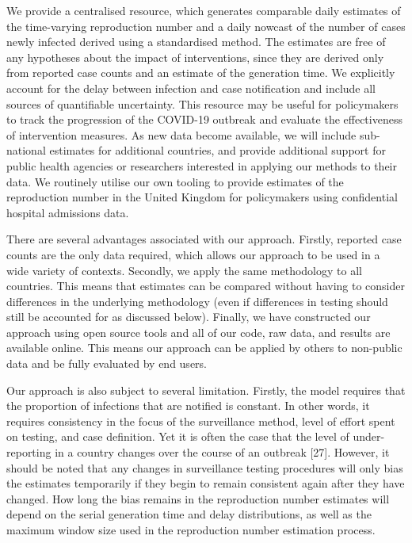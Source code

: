 \documentclass[]{article}
\begin{document}
We provide a centralised resource, which generates comparable daily
estimates of the time-varying reproduction number and a daily nowcast of
the number of cases newly infected derived using a standardised method.
The estimates are free of any hypotheses about the impact of
interventions, since they are derived only from reported case counts and
an estimate of the generation time. We explicitly account for the delay
between infection and case notification and include all sources of
quantifiable uncertainty. This resource may be useful for policymakers
to track the progression of the COVID-19 outbreak and evaluate the
effectiveness of intervention measures. As new data become available, we
will include sub-national estimates for additional countries, and
provide additional support for public health agencies or researchers
interested in applying our methods to their data. We routinely utilise
our own tooling to provide estimates of the reproduction number in the
United Kingdom for policymakers using confidential hospital admissions
data.

There are several advantages associated with our approach. Firstly,
reported case counts are the only data required, which allows our
approach to be used in a wide variety of contexts. Secondly, we apply
the same methodology to all countries. This means that estimates can be
compared without having to consider differences in the underlying
methodology (even if differences in testing should still be accounted
for as discussed below). Finally, we have constructed our approach using
open source tools and all of our code, raw data, and results are
available online. This means our approach can be applied by others to
non-public data and be fully evaluated by end users.

Our approach is also subject to several limitation. Firstly, the model
requires that the proportion of infections that are notified is
constant. In other words, it requires consistency in the focus of the
surveillance method, level of effort spent on testing, and case
definition. Yet it is often the case that the level of under-reporting
in a country changes over the course of an outbreak {[}27{]}. However,
it should be noted that any changes in surveillance testing procedures
will only bias the estimates temporarily if they begin to remain
consistent again after they have changed. How long the bias remains in
the reproduction number estimates will depend on the serial generation
time and delay distributions, as well as the maximum window size used in
the reproduction number estimation process.
\end{document}
